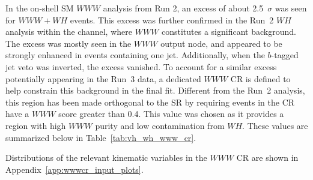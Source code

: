 In the on-shell SM $WWW$ analysis from Run 2, an excess of about 2.5~$\sigma$ was seen for $WWW + WH$ events. This excess was further confirmed in the Run~2 $WH$ analysis within the \zdep{} channel, where $WWW$ constitutes a significant background. The excess was mostly seen in the $WWW$ output node, and appeared to be strongly enhanced in events containing one jet. Additionally, when the $b$-tagged jet veto was inverted, the excess vanished. To account for a similar excess potentially appearing in the Run~3 data, a dedicated $WWW$ CR is defined to help constrain this background in the final fit. Different from the Run~2 analysis, this region has been made orthogonal to the SR by requiring events in the CR have a $WWW$ score greater than 0.4. This value was chosen as it provides a region with high $WWW$ purity and low contamination from $WH$. These values are summarized below in Table~\ref{tab:vh_wh_www_cr}.

\begin{table}[htb]
    \centering
    \caption{Event yields in the \zdep{} SR from simulation as a function of minimum $WWW$ ANN output node score. The $WH$ signal and $WWW$ fractions are also provided. }\label{tab:vh_wh_www_cr}
\end{table}

Distributions of the relevant kinematic variables in the $WWW$ CR are shown in Appendix~\ref{app:wwwcr_input_plots}.